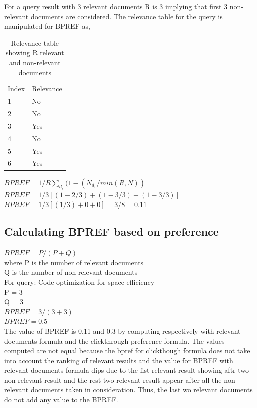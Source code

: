 \documentclass[12pt]{report}
\begin{document}
For a query result with 3 relevant documents R is 3 implying that first 3 non-relevant documents are considered. The relevance table for the query is manipulated for BPREF as,\\

\begin{table}[]
\centering
\caption{Relevance table showing R relevant and non-relevant documents}
\label{my-label}
\begin{tabular}{ll}
Index & Relevance \\
1     & No       \\
2     & No        \\
3     & Yes        \\
4     & No       \\
5     & Yes        \\
6     & Yes      

\end{tabular}
\end{table}
$BPREF = 1/R \sum\limits_{d_r}^{}(1- ({N_{d_r}} / min(R,N))$\\
$BPREF = 1/3[(1-2/3) + (1 - 3/3) + (1- 3/3)]$\\
$BPREF = 1/3 [(1/3) + 0 + 0] = 3/8 = 0.11$

\subsection{Calculating BPREF based on preference}

$BPREF = P /( P + Q)$\\
where P is the number of relevant documents \\
          Q is the number of non-relevant documents\\
For query: Code optimization for space efficiency\\
P = 3\\
Q = 3\\
$BPREF = 3/(3+3)$\\
$BPREF = 0.5$\\

The value of BPREF is 0.11 and 0.3 by computing respectively with relevant documents formula and the clickthrough preference formula. The values computed are not equal because the bpref for clickthough formula does not take into account the ranking of relevant results and the value for BPREF with relevant documents formula dips due to the fist relevant result showing aftr two non-relevant result and the rest two relevant result appear after all the non-relevant documents taken in consideration. Thus, the last wo relevant documents do not add any value to the BPREF.
 
\end{document}
